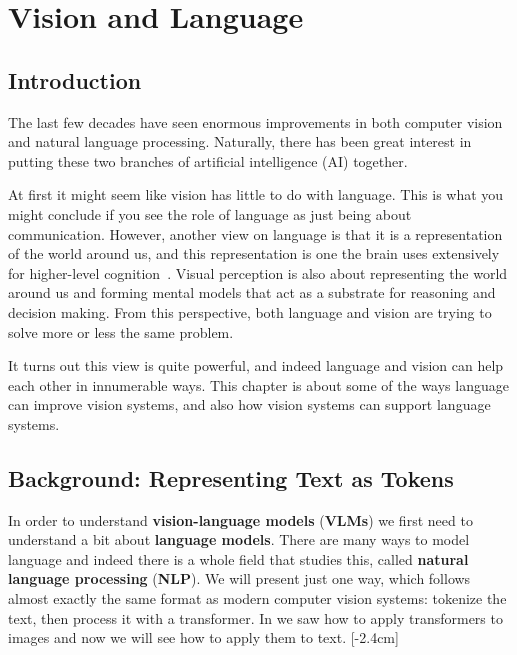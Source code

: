 \chapter{Vision and Language}\label{chapter:VLMs}

\section{Introduction}

The last few decades have seen enormous improvements in both computer vision and natural language processing. Naturally, there has been great interest in putting these two branches of artificial intelligence (AI) together.

At first it might seem like vision has little to do with language. This is what you might conclude if you see the role of language as just being about communication. However, another view on language is that it is a representation of the world around us, and this representation is one the brain uses extensively for higher-level cognition~\cite{fodor1975language}. Visual perception is also about representing the world around us and forming mental models that act as a substrate for reasoning and decision making. From this perspective, both language and vision are trying to solve more or less the same problem.

It turns out this view is quite powerful, and indeed language and vision can help each other in innumerable ways. This chapter is about some of the ways language can improve vision systems, and also how vision systems can support language systems.

\section{Background: Representing Text as Tokens}
In order to understand \textbf{vision-language models} (\textbf{VLMs}) we first need to understand a bit about \textbf{language models}. There are many ways to model language and indeed there is a whole field that studies this, called \textbf{natural language processing} (\textbf{NLP}). We will present just one way, which follows almost exactly the same format as modern computer vision systems: tokenize the text, then process it with a transformer. In \chap{\ref{chapter:transformers}} we saw how to apply transformers to images and now we will see how to apply them to text.
[-2.4cm]

